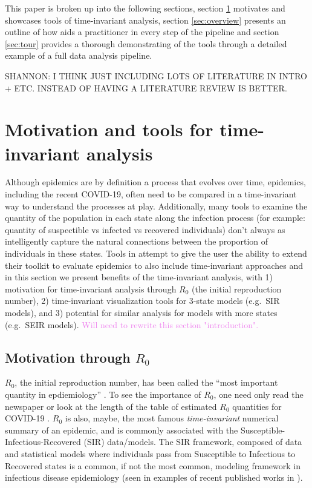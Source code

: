 \documentclass[
  shortnames]{jss}
\begin{document}
This paper is broken up into the following sections, section
\ref{sec:time-invariant} motivates and showcases tools of time-invariant
analysis, section \ref{sec:overview} presents an outline of how
 aids a practitioner in every step of the pipeline and
section \ref{sec:tour} provides a thorough demonstrating of the tools
through a detailed example of a full data analysis pipeline.

SHANNON: I THINK JUST INCLUDING LOTS OF LITERATURE IN INTRO + ETC.
INSTEAD OF HAVING A LITERATURE REVIEW IS BETTER.

\section[Time-invariant]{Motivation and tools for time-invariant
analysis}\label{sec:time-invariant}

Although epidemics are by definition a process that evolves over time,
epidemics, including the recent COVID-19, often need to be compared in a
time-invariant way to understand the processes at play. Additionally,
many tools to examine the quantity of the population in each state along
the infection process (for example: quantity of suspectible vs infected
vs recovered individuals) don't always as intelligently capture the
natural connections between the proportion of individuals in these
states. Tools in  attempt to give the user the ability
to extend their toolkit to evaluate epidemics to also include
time-invariant approaches and in this section we present benefits of the
time-invariant analysis, with 1) motivation for time-invariant analysis
through \(R_0\) (the initial reproduction number), 2) time-invariant
visualization tools for 3-state models (e.g.~SIR models), and 3)
potential for similar analysis for models with more states (e.g.~SEIR
models).
\textcolor{violet}{Will need to rewrite this section "introduction".}

\subsection[r0]{Motivation through \(R_0\)}\label{r0}

\(R_0\), the initial reproduction number, has been called the ``most
important quantity in epdiemiology'' \citep[][]{Gallagher2020}. To see
the importance of \(R_0\), one need only read the newspaper
\citep{Fisher2020} or look at the length of the table of estimated
\(R_0\) quantities for COVID-19 \citep{Aronson2020}. \(R_0\) is also,
maybe, the most famous \textit{time-invariant} numerical summary of an
epidemic, and is commonly associated with the
Susceptible-Infectious-Recovered (SIR) data/models. The SIR framework,
composed of data and statistical models where individuals pass from
Susceptible to Infectious to Recovered states is a common, if not the
most common, modeling framework in infectious disease epidemiology (seen
in examples of recent published works in \cite{FILLIN}).
\end{document}
